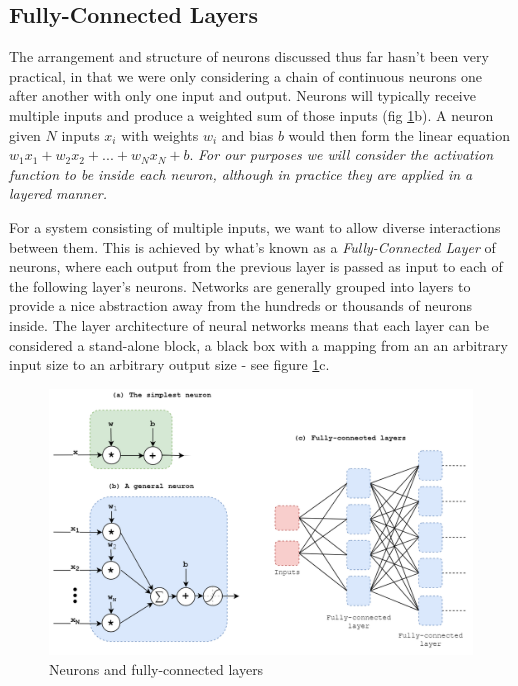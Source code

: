 \documentclass{report}
\begin{document}
	\subsection{Fully-Connected Layers}
	The arrangement and structure of neurons discussed thus far hasn't been very practical, in that we were only considering a chain of continuous neurons one after another with only one input and output. Neurons will typically receive multiple inputs and produce a weighted sum of those inputs (fig \ref{fig:neurons:1}b). A neuron given $N$ inputs $x_i$ with weights $w_i$ and bias $b$ would then form the linear equation $w_1x_1 + w_2x_2 + ... + w_Nx_N + b$. \textit{For our purposes we will consider the activation function to be inside each neuron, although in practice they are applied in a layered manner.} \par
	For a system consisting of multiple inputs, we want to allow diverse interactions between them. This is achieved by what's known as a \textit{Fully-Connected Layer} of neurons, where each output from the previous layer is passed as input to each of the following layer's neurons. Networks are generally grouped into layers to provide a nice abstraction away from the hundreds or thousands of neurons inside. The layer architecture of neural networks means that each layer can be considered a stand-alone block, a black box with a mapping from an an arbitrary input size to an arbitrary output size - see figure \ref{fig:neurons:1}c. \par
	\begin{figure}[h]
		\centering
		\includegraphics[width=14cm]{neurons}
		\caption{Neurons and fully-connected layers}
		\label{fig:neurons:1}
	\end{figure}
\end{document}
